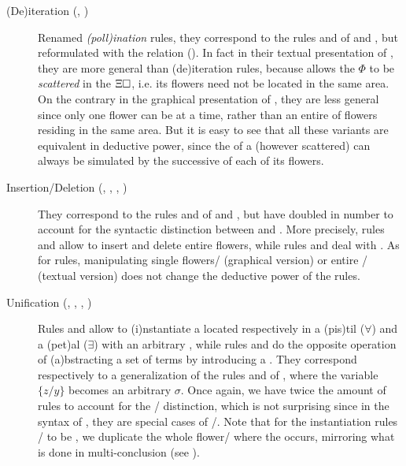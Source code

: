 \begin{scope}
\begin{description}
  \item[(De)iteration (, )]
    Renamed \emph{\textsf{(poll)}ination} rules, they correspond to the rules
     and  of  and , but reformulated with
    the  relation (). In fact in their
    textual presentation of , they are more general than
    (de)iteration rules, because  allows the
      $\Phi$ to be \emph{scattered} in the
     $\Xi\square$, i.e. its flowers need not be located in the same
    area. On the contrary in the graphical presentation of
    , they are less general since only one flower can
    be  at a time, rather than an entire  of flowers
    residing in the same area. But it is easy to see that all these variants are
    equivalent in deductive power, since the  of a 
    (however scattered) can always be simulated by the successive
     of each of its flowers.

  \item[Insertion/Deletion (, , , )]
    They correspond to the rules  and  of  and
    , but have doubled in number to account for the syntactic
    distinction between  and . More precisely, rules  and
     allow to insert and delete entire flowers, while rules 
    and  deal with . As for  rules, manipulating
    single flowers/ (graphical version) or entire /
    (textual version) does not change the deductive power of the rules.
    
  \item[Unification (, , , )]
    Rules  and  allow to \textsf{(i)}nstantiate a
     located respectively in a \textsf{(pis)}til ($\forall$) and a
    \textsf{(pet)}al ($\exists$) with an arbitrary , while
    rules  and  do the opposite operation of
    \textsf{(a)}bstracting a set of terms by introducing a . They
    correspond respectively to a generalization of the rules  and
     of , where the variable  $\{z/y\}$
    becomes an arbitrary  $\sigma$. Once again, we have twice
    the amount of rules to account for the / distinction,
    which is not surprising since in the  syntax of , they are
    special cases of /. Note that for the
    instantiation rules / to be , we duplicate
    the whole flower/ where the  occurs, mirroring what
    is done in multi-conclusion  (see ).
\end{description}


\end{scope}
